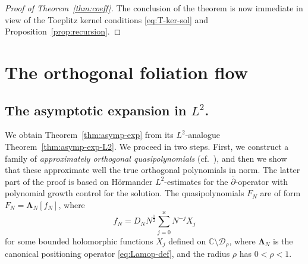 \documentclass{amsart}
\newcommand{\be}{\begin{equation}}
\newcommand{\ee}{\end{equation}}
\newcommand{\C}{\mathbb{C}}
\newcommand{\calD}{\mathcal{D}}
\newcommand{\Lamop}{\mathbf{\Lambda}}
\theoremstyle{definition}
\theoremstyle{remark}
\numberwithin{equation}{subsection}
\begin{document}
\begin{proof}[Proof of Theorem~\ref{thm:coeff}]
The conclusion of the theorem is now
immediate in view of the Toeplitz kernel conditions 
\eqref{eq:T-ker-sol} and Proposition~\ref{prop:recursion}.
\end{proof}











\section{The orthogonal foliation flow}
\label{s:foliation}

\subsection{The asymptotic expansion in \texorpdfstring{$L^2$}{L2}.}
We obtain Theorem~\ref{thm:asymp-exp} from its
$L^2$-analogue Theorem~\ref{thm:asymp-exp-L2}.
We proceed in two steps. First, we construct a family of
{\em approximately orthogonal quasipolynomials} 
(cf.\ \cite[Subsection~3.2]{HW-ONP}), and then we show that these 
approximate well the true orthogonal polynomials in norm.
The latter part of the proof is based on 
H{\"o}rmander $L^2$-estimates for the $\bar\partial$-operator
with polynomial growth control for the solution.
The quasipolynomials $F_N$ are of form $F_N=\Lamop_N[f_N]$, where
\be
f_N=D_N N^{\frac12}\sum_{j=0}^\varkappa N^{-j}X_j
\ee
for some bounded
holomorphic functions $X_j$ defined on $\C\setminus\calD_{\rho}$,
where $\Lamop_N$ is the canonical positioning operator 
\eqref{eq:Lamop-def}, and the radius $\rho$ has $0<\rho<1$.
\end{document}
